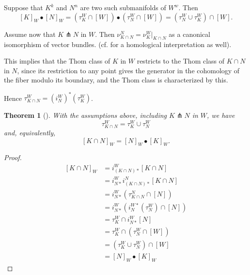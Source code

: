 \documentclass[reqno]{amsart}
\newtheorem{theorem}{Theorem}[section]
\theoremstyle{definition}
\theoremstyle{remark}
\begin{document}
      Suppose that $K^{k}$ and $N^{n}$ are two such submanifolds of
      $W^{w}$. Then
      \[
      \left[ K \right]_W \bullet \left[ N \right]_W = 
      \left( \tau_K^{W} \cap \left[ W \right]  \right) \bullet
      \left( \tau_N^{W} \cap \left[ W \right]  \right) 
      = \left( \tau_N^{W} \cup \tau_K^{W} \right) \cap \left[ W \right] .
      \] 

      Assume now that
      $K \pitchfork N$  in $W$. Then
      $\nu_{K \cap N}^{N} = \nu_{K}^{W}|_{K \cap N}$ 
      as a canonical isomorphism of vector bundles.
      (cf. \cite[VIII, §11]{Dold} for a homological interpretation as well).

      This implies that the Thom class of $K$ in $W$ restricts
      to the Thom class of $K \cap N$ in $N$, since
      its restriction to any point gives the generator in the
      cohomology of the fiber modulo its boundary, and the
      Thom class is characterized by this.

      Hence $\tau_{K \cap N}^{W} = (i_N^{W})^{*} \left( \tau_K^{W} \right) $.




      \begin{theorem}[]
          With the assumptions above, including $K \pitchfork N$ in
          $W$, we have 
          \[
          \tau_{K \cap N}^{W} = \tau_K^{W} \cup \tau_N^{W}
          \] 
          and, equivalently, 
          \[
          \left[ K \cap N \right]_W = \left[ N \right]_W \bullet
          \left[ K \right]_W.
          \]
      \end{theorem}

      \begin{proof}
          \begin{align*}
              \left[ K \cap N \right]_W 
              &=  i_{(K \cap N)*}^{W}
              \left[ K \cap N \right] \\
              &= i_{N*}^{W} 
              i_{(K \cap N)*}^{N}
              \left[ K \cap N \right] \\
              &= i_{N*}^{W}
              \left( \tau_{K \cap N}^{N} \cap \left[ N \right]  \right) \\
              &=  i_{N*}^{W}
              \left( i_N^{W*}  (\tau_N^{W}) \cap
              \left[ N \right] \right) \\
              &= \tau_{K}^{W} \cap
              i_{N*}^{W} \left[ N \right] \\
              &= \tau_{K}^{W} \cap \left( \tau_N^{W} \cap
              \left[ W \right] \right) \\
              &= \left( \tau_K^{W} \cup 
              \tau_N^{W} \right) \cap \left[ W \right] \\
              &= \left[ N \right]_W \bullet \left[ K \right]_W
          \end{align*}
      \end{proof}
\end{document}
